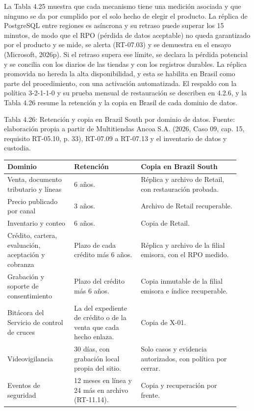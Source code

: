 \documentclass[11pt]{article}
\begin{document}
La Tabla 4.25 muestra que cada mecanismo tiene una medición asociada y que ninguno se da por cumplido por el solo hecho de elegir el producto. La réplica de PostgreSQL entre regiones es asíncrona y su retraso puede superar los 15 minutos, de modo que el RPO (pérdida de datos aceptable) no queda garantizado por el producto y se mide, se alerta (RT-07.03) y se demuestra en el ensayo (Microsoft, 2026p). Si el retraso supera ese límite, se declara la pérdida potencial y se concilia con los diarios de las tiendas y con los registros durables. La réplica promovida no hereda la alta disponibilidad, y esta se habilita en Brasil como parte del procedimiento, con una activación automatizada. El respaldo con la política 3-2-1-1-0 y su prueba mensual de restauración se describen en 4.2.6, y la Tabla 4.26 resume la retención y la copia en Brasil de cada dominio de datos.

\par\vspace{0pt plus 10\baselineskip}\vspace{0pt plus -10\baselineskip}

Tabla 4.26: Retención y copia en Brazil South por dominio de datos. Fuente: elaboración propia a partir de Multitiendas Ancoa S.A. (2026, Caso 09, cap. 15, requisito RT-05.10, p. 33), RT-07.09 a RT-07.13 y el inventario de datos y custodia.\par\nopagebreak
\begin{longtable}{@{}p{0.27\linewidth}p{0.27\linewidth}p{0.40\linewidth}@{}}
\toprule Dominio & Retención & Copia en Brazil South \\
\midrule\endhead\bottomrule\endlastfoot
Venta, documento tributario y líneas & 6 años. & Réplica y archivo de Retail, con restauración probada. \\
Precio publicado por canal & 3 años. & Archivo de Retail recuperable. \\
Inventario y conteo & 6 años. & Copia de Retail. \\
Crédito, cartera, evaluación, aceptación y cobranza & Plazo de cada crédito más 6 años. & Réplica y archivo de la filial emisora, con el RPO medido. \\
Grabación y soporte de consentimiento & Plazo del crédito más 6 años. & Copia inmutable de la filial emisora e índice recuperable. \\
Bitácora del Servicio de control de cruces & La del expediente de crédito o de la venta que cada hecho enlaza. & Copia de X-01. \\
Videovigilancia & 30 días, con grabación local propia del sitio. & Solo casos y evidencia autorizados, con política por cerrar. \\
Eventos de seguridad & 12 meses en línea y 24 más en archivo (RT-11.14). & Copia y recuperación por frente. \\
\end{longtable}
\end{document}
